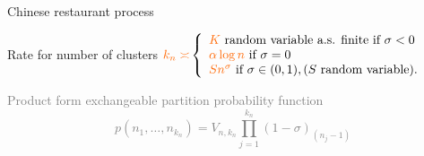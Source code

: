 \begin{frame}{Chinese restaurant process}
{\begin{center}
Rate for number of clusters 
$\alert{k_n \asymp }
\left\{
\begin{array}{l}
\alert{K} \text{ random variable a.s. finite if }\sigma<0\\
\alert{\alpha \log n}  \text{  if }\sigma=0\\
\alert{S n^\sigma} \text{ if }\sigma\in(0,1), (S \text{ random variable)}.
\end{array}
\right.
$
\end{center}
\medskip

\textcolor{gray}{
Product form exchangeable partition probability function  
$$p(n_1,\ldots,n_{k_n})=V_{n,{k_n}}\prod_{j=1}^{k_n}(1-\sigma)_{(n_j-1)}$$}
}
\end{frame}



